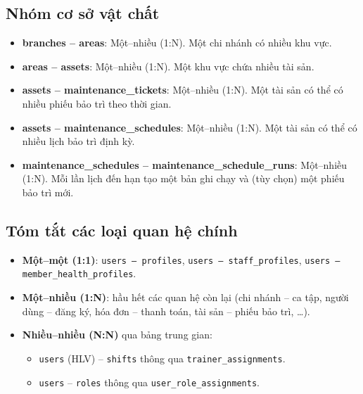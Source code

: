 \subsection*{Nhóm cơ sở vật chất}
\begin{itemize}
    \item \textbf{branches – areas}: Một–nhiều (1:N). Một chi nhánh có nhiều khu vực.
    \item \textbf{areas – assets}: Một–nhiều (1:N). Một khu vực chứa nhiều tài sản.
    \item \textbf{assets – maintenance\_tickets}: Một–nhiều (1:N). Một tài sản có thể có nhiều phiếu bảo trì theo thời gian.
    \item \textbf{assets – maintenance\_schedules}: Một–nhiều (1:N). Một tài sản có thể có nhiều lịch bảo trì định kỳ.
    \item \textbf{maintenance\_schedules – maintenance\_schedule\_runs}: Một–nhiều (1:N). Mỗi lần lịch đến hạn tạo một bản ghi chạy và (tùy chọn) một phiếu bảo trì mới.
\end{itemize}

\subsection*{Tóm tắt các loại quan hệ chính}
\begin{itemize}
    \item \textbf{Một–một (1:1)}: \texttt{users – profiles}, \texttt{users – staff\_profiles}, \texttt{users – member\_health\_profiles}.
    \item \textbf{Một–nhiều (1:N)}: hầu hết các quan hệ còn lại (chi nhánh – ca tập, người dùng – đăng ký, hóa đơn – thanh toán, tài sản – phiếu bảo trì, \ldots).
    \item \textbf{Nhiều–nhiều (N:N)} qua bảng trung gian:
        \begin{itemize}
            \item \texttt{users} (HLV) – \texttt{shifts} thông qua \texttt{trainer\_assignments}.
            \item \texttt{users} – \texttt{roles} thông qua \texttt{user\_role\_assignments}.
        \end{itemize}
\end{itemize}

